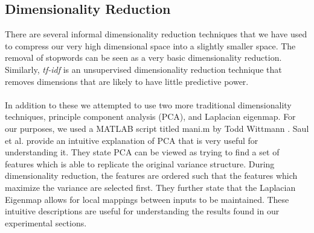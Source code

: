\subsection{Dimensionality Reduction}
There are several informal dimensionality reduction techniques that we have used to compress our very high dimensional space into a slightly smaller space. The removal of stopwords can be seen as a very basic dimensionality reduction. Similarly, \emph{tf-idf} is an unsupervised dimensionality reduction technique that removes dimensions that are likely to have little predictive power.  
\\
\\In addition to these we attempted to use two more traditional dimensionality techniques, principle component analysis (PCA), and Laplacian eigenmap.  For our purposes, we used a MATLAB script titled mani.m by Todd Wittmann \cite{Wittman}.   Saul et al. \cite{saul06spectral} provide an intuitive explanation of PCA that is very useful for understanding it.  They state PCA can be viewed as trying to find a set of features which is able to replicate the original variance structure.  During dimensionality reduction, the features are ordered such that the features which maximize the variance are selected first.  They further state that the Laplacian Eigenmap allows for local mappings between inputs to be maintained.  These intuitive descriptions are useful for understanding the results found in our experimental sections.




